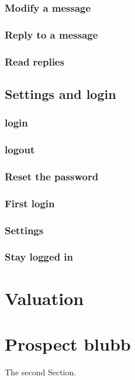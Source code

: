 \documentclass[12pt,a4paper,oneside]{report}
\begin{document}
\subsection{Modify a message}

\subsection{Reply to a message}

\subsection{Read replies}

\section{Settings and login}

\subsection{login}

\subsection{logout}

\subsection{Reset the password}

\subsection{First login}

\subsection{Settings}

\subsection{Stay logged in}

\chapter{Valuation}

\chapter{Prospect blubb}


The second Section.\\

\printbibliography
%
\end{document}
